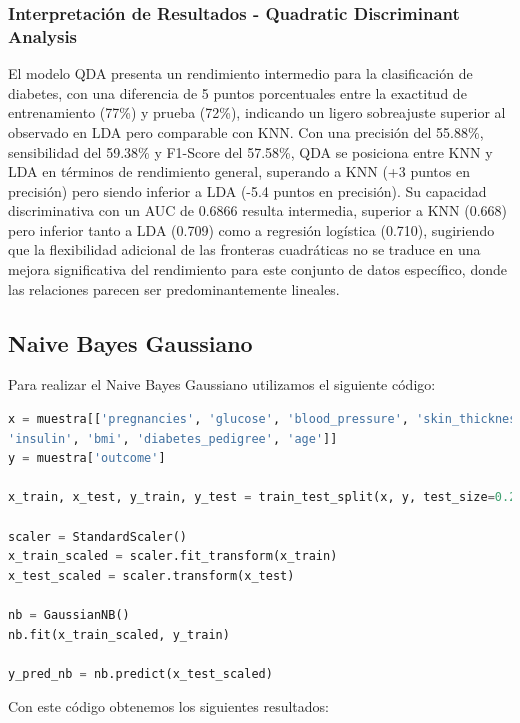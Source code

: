 \documentclass[12pt,a4paper]{article}
\begin{document}
\subsubsection{Interpretación de Resultados - Quadratic Discriminant Analysis}

El modelo QDA presenta un rendimiento intermedio para la clasificación de diabetes, con una diferencia de 5 puntos porcentuales entre la exactitud de entrenamiento (77\%) y prueba (72\%), indicando un ligero sobreajuste superior al observado en LDA pero comparable con KNN. Con una precisión del 55.88\%, sensibilidad del 59.38\% y F1-Score del 57.58\%, QDA se posiciona entre KNN y LDA en términos de rendimiento general, superando a KNN (+3 puntos en precisión) pero siendo inferior a LDA (-5.4 puntos en precisión). Su capacidad discriminativa con un AUC de 0.6866 resulta intermedia, superior a KNN (0.668) pero inferior tanto a LDA (0.709) como a regresión logística (0.710), sugiriendo que la flexibilidad adicional de las fronteras cuadráticas no se traduce en una mejora significativa del rendimiento para este conjunto de datos específico, donde las relaciones parecen ser predominantemente lineales.

\newpage

\subsection{Naive Bayes Gaussiano}

Para realizar el Naive Bayes Gaussiano utilizamos el siguiente código: 

\begin{lstlisting}[language=Python, frame=single, basicstyle=\ttfamily\small, breaklines=true]
x = muestra[['pregnancies', 'glucose', 'blood_pressure', 'skin_thickness',
'insulin', 'bmi', 'diabetes_pedigree', 'age']]
y = muestra['outcome']

x_train, x_test, y_train, y_test = train_test_split(x, y, test_size=0.2, random_state=4181, shuffle=True)

scaler = StandardScaler()
x_train_scaled = scaler.fit_transform(x_train)
x_test_scaled = scaler.transform(x_test)

nb = GaussianNB()
nb.fit(x_train_scaled, y_train)

y_pred_nb = nb.predict(x_test_scaled)
\end{lstlisting}

Con este código obtenemos los siguientes resultados:
\end{document}
